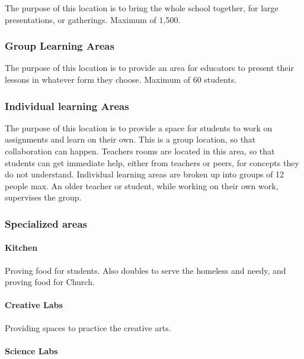 \documentclass[CSHFoundation.tex]{subfiles}
\begin{document}
The purpose of this location is to bring the whole school together, for large presentations, or gatherings. Maximum of 1,500.



\subsubsection{Group Learning Areas}



The purpose of this location is to provide an area for educators to present their lessons in whatever form they choose. Maximum of 60 students.



\subsubsection{Individual learning Areas}



The purpose of this location is to provide a space for students to work on assignments and learn on their own. This is a group location, so that collaboration can happen. Teachers rooms are located in this area, so that students can get immediate help, either from teachers or peers, for concepts they do not understand. Individual learning areas are broken up into groups of 12 people max. An older teacher or student, while working on their own work, supervises the group.



\subsubsection{Specialized areas}

\paragraph{Kitchen}

Proving food for students. Also doubles to serve the homeless and needy, and proving food for Church.

\paragraph{Creative Labs}

Providing spaces to practice the creative arts.

\paragraph{Science Labs}
\end{document}
